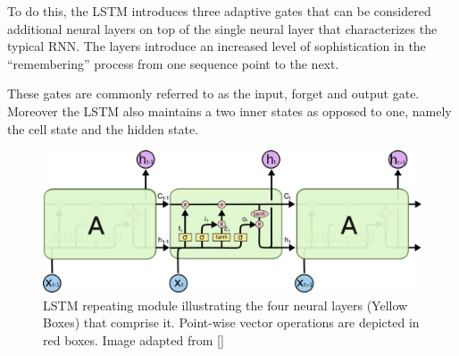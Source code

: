 \documentclass[12pt, a4paper]{report}
\theoremstyle{definition}
\theoremstyle{definition}%
\theoremstyle{definition}%
\theoremstyle{definition}%
\theoremstyle{definition}%
\theoremstyle{definition}%
\renewcommand{\cite}[1]{[\citealp{#1}]}
\begin{document}
To do this, the LSTM introduces three adaptive gates that can be considered additional neural layers on top of the single neural layer that characterizes the typical RNN. The layers introduce an increased level of sophistication in the \enquote{remembering} process from one sequence point to the next.

These gates are commonly referred to as the input, forget and output gate. Moreover the LSTM also maintains a two inner states as opposed to one, namely the cell state and the hidden state.

\begin{figure}[!ht]
	\centering
	\includegraphics[width=1\textwidth]{./figures/lstm_architecture.png}
	\caption{LSTM repeating module illustrating the four neural layers (Yellow Boxes) that comprise it. Point-wise vector operations are depicted in red boxes. Image adapted from \cite{colah-understanding-lstm}}
	\label{fig:lstm_architecture}
\end{figure}
\end{document}
